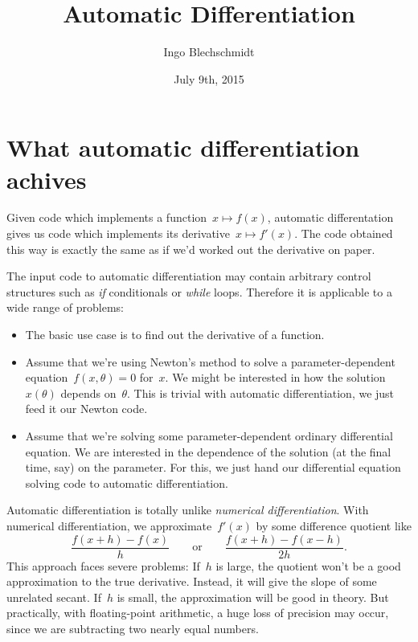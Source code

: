 \documentclass[a4paper,ngerman,12pt]{scrartcl}
\theoremstyle{definition}
\theoremstyle{plain}
\theoremstyle{remark}
\begin{document}
\title{Automatic Differentiation}
\author{Ingo Blechschmidt}
\date{July 9th, 2015}
\maketitle

\section{What automatic differentiation achives}

Given code which implements a function~$x \mapsto f(x)$, automatic
differentation gives us code which implements its derivative~$x \mapsto
f'(x)$. The code obtained this way is exactly the same as if we'd worked out
the derivative on paper.

The input code to automatic differentiation may contain arbitrary control
structures such as \emph{if} conditionals or \emph{while} loops. Therefore it
is applicable to a wide range of problems:

\begin{itemize}
\item The basic use case is to find out the derivative of a function.
\item Assume that we're using Newton's method to solve a parameter-dependent
equation~$f(x,\theta) = 0$ for~$x$. We might be interested in how the
solution~$x(\theta)$ depends on~$\theta$. This is trivial with automatic
differentiation, we just feed it our Newton code.
\item Assume that we're solving some parameter-dependent ordinary differential
equation. We are interested in the dependence of the solution (at the final
time, say) on the parameter. For this, we just hand our differential equation
solving code to automatic differentiation.
\end{itemize}

Automatic differentiation is totally unlike \emph{numerical
differentiation}. With numerical differentiation, we approximate~$f'(x)$ by
some difference quotient like
\[ \frac{f(x + h) - f(x)}{h} \qquad\text{or}\qquad
  \frac{f(x + h) - f(x - h)}{2h}. \]
This approach faces severe problems: If~$h$ is large, the quotient won't be a
good approximation to the true derivative. Instead, it will give the slope of
some unrelated secant. If~$h$ is small, the approximation will be good in
theory. But practically, with floating-point arithmetic, a huge loss of
precision may occur, since we are subtracting two nearly equal numbers.
\end{document}
